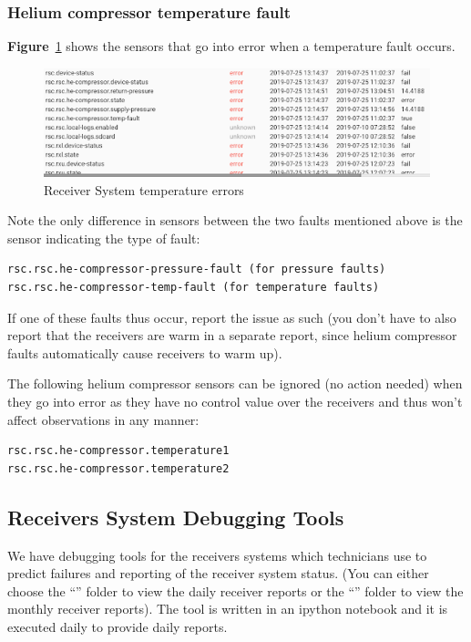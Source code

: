 \subsubsection{Helium compressor temperature fault}
\textbf{Figure}~\ref{fig:He2} shows the sensors that go into error when a temperature fault occurs.



\begin{figure}[!thb]
	\centering
	\includegraphics[scale=0.8]{Chapters/images/He2.png}
	
	\caption{Receiver System temperature errors}
	\label{fig:He2}
\end{figure}
Note the only difference in sensors between the two faults mentioned above is the sensor indicating the type of fault:
\begin{lstlisting}[style=DOS]
rsc.rsc.he-compressor-pressure-fault (for pressure faults)
rsc.rsc.he-compressor-temp-fault (for temperature faults)
\end{lstlisting}

If one of these faults thus occur, report the issue as such (you don’t have to also report that the receivers are warm in a separate report, since helium compressor faults automatically cause receivers to warm up).

The following helium compressor sensors can be ignored (no action needed) when they go into error as they have no control value over the receivers and thus won’t affect observations in any manner:
\begin{lstlisting}[style=DOS]
rsc.rsc.he-compressor.temperature1
rsc.rsc.he-compressor.temperature2
\end{lstlisting}

\subsection{ Receivers System Debugging Tools}
We have debugging tools for the receivers systems which technicians use to predict failures and reporting of the receiver system status.  (You can either choose the “” folder to view the daily receiver reports or the “” folder to view the monthly receiver reports). The tool is written in an ipython notebook and it is executed daily to provide daily reports. 

